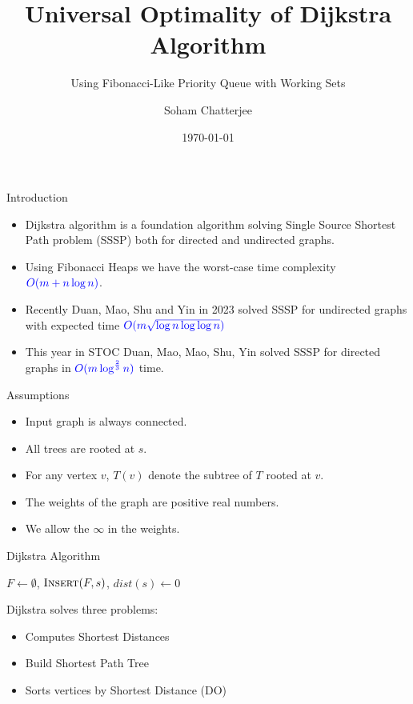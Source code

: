 \documentclass[10pt, handout]{beamer}
\title{Universal Optimality of Dijkstra Algorithm}
\subtitle{Using Fibonacci-Like Priority Queue with Working Sets}
\date{\today}
\author{Soham Chatterjee}
\institute{Oral Qualifier, STCS}
\begin{document}
\maketitle


\begin{frame}{Introduction}
	\begin{itemize}
		\item Dijkstra algorithm is a foundation algorithm solving Single Source Shortest Path problem (SSSP) both for directed and undirected graphs.\vfill
		\item Using Fibonacci Heaps we have the worst-case time complexity $\mathcolor{blue}{O(m+n\log n)}$. \vfill \pause
		\item Recently Duan, Mao, Shu and Yin in 2023 solved SSSP for undirected graphs with expected time $\mathcolor{blue}{O(m\sqrt{\log n\log\log n})}$\vfill\pause
		\item This year in STOC Duan, Mao, Mao, Shu, Yin solved SSSP for directed graphs in $\mathcolor{blue}{O(m\log^{\frac23}n)}$ time.
	\end{itemize}
\end{frame}
\begin{frame}{Assumptions}\begin{itemize}
		\item Input graph is always connected. \vfill
		\item All trees are rooted at $s$. \vfill
		\item For any vertex $v$, $T(v)$ denote the subtree of $T$ rooted at $v$.\vfill
		\item The weights of the graph are positive real numbers. \vfill
		\item We allow the $\infty$ in the weights.
	\end{itemize}

\end{frame}
\begin{frame}{Dijkstra Algorithm}

	\begin{algorithm}[H]
		\DontPrintSemicolon
		$F\longleftarrow \emptyset$, $\textsc{Insert}(F,s)$, 	$dist(s)\longleftarrow 0$\;
		\caption{\textsc{Dijkstra}$(G,s,w)$}
	\end{algorithm}\pause
	Dijkstra solves three problems:
	\begin{itemize}
		\item  Computes Shortest Distances\pause
		\item  Build Shortest Path Tree\pause
		\item Sorts vertices by Shortest Distance (DO)
	\end{itemize}
\end{frame}
\end{document}
